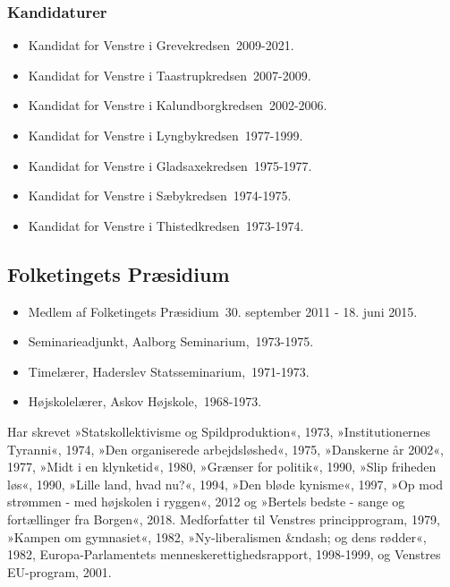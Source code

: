 \documentclass[11pt, a4paper]{awesome-cv}
\begin{document}
\begin{cvletter}
\subsubsection*{Kandidaturer}
\begin{itemize}
\item Kandidat for Venstre i Grevekredsen 2009-2021.
\item Kandidat for Venstre i Taastrupkredsen 2007-2009.
\item Kandidat for Venstre i Kalundborgkredsen 2002-2006.
\item Kandidat for Venstre i Lyngbykredsen 1977-1999.
\item Kandidat for Venstre i Gladsaxekredsen 1975-1977.
\item Kandidat for Venstre i Sæbykredsen 1974-1975.
\item Kandidat for Venstre i Thistedkredsen 1973-1974.
\end{itemize}
\subsection*{Folketingets Præsidium}
\begin{itemize}
\item Medlem af Folketingets Præsidium 30. september 2011 - 18. juni 2015.
\end{itemize}
\begin{itemize}
\item Seminarieadjunkt, Aalborg Seminarium, 1973-1975.
\item Timelærer, Haderslev Statsseminarium, 1971-1973.
\item Højskolelærer, Askov Højskole, 1968-1973.
\end{itemize}
Har skrevet »Statskollektivisme og Spildproduktion«, 1973, »Institutionernes Tyranni«, 1974, »Den organiserede arbejdsløshed«, 1975, »Danskerne år 2002«, 1977, »Midt i en klynketid«, 1980, »Grænser for politik«, 1990, »Slip friheden løs«, 1990, »Lille land, hvad nu?«, 1994, »Den bløde kynisme«, 1997, »Op mod strømmen - med højskolen i ryggen«, 2012 og »Bertels bedste - sange og fortællinger fra Borgen«, 2018. Medforfatter til Venstres principprogram, 1979, »Kampen om gymnasiet«, 1982, »Ny-liberalismen &ndash; og dens rødder«, 1982, Europa-Parlamentets menneskerettighedsrapport, 1998-1999, og Venstres EU-program, 2001.

\end{cvletter}
\end{document}
